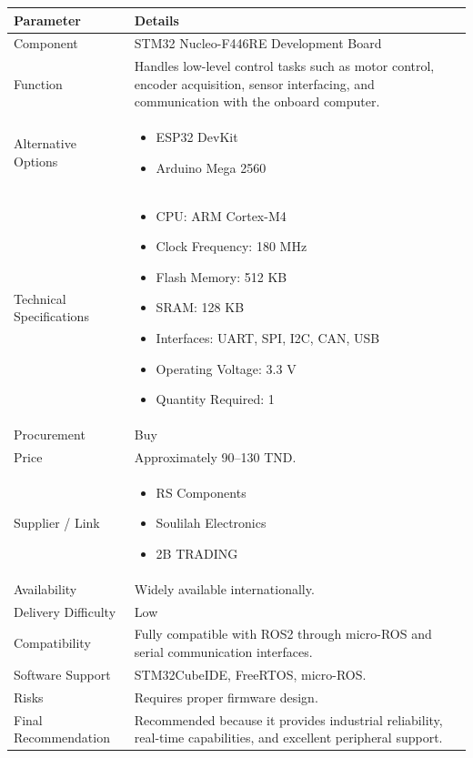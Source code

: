 \documentclass[12pt,a4paper]{article}
\begin{document}
\begin{longtable}{|p{4cm}|p{10cm}|}
\hline
\textbf{Parameter} & \textbf{Details} \\
\hline

Component &
STM32 Nucleo-F446RE Development Board \\
\hline

Function &
Handles low-level control tasks such as motor control, encoder acquisition, sensor interfacing, and communication with the onboard computer. \\
\hline


Alternative Options &
\begin{itemize}
\item ESP32 DevKit
\item Arduino Mega 2560
\end{itemize}
\\
\hline

Technical Specifications &
\begin{itemize}
\item CPU: ARM Cortex-M4
\item Clock Frequency: 180 MHz
\item Flash Memory: 512 KB
\item SRAM: 128 KB
\item Interfaces: UART, SPI, I2C, CAN, USB
\item Operating Voltage: 3.3 V
\item Quantity Required: 1
\end{itemize}
\\
\hline

Procurement &
Buy \\
\hline

Price &
Approximately 90--130 TND. \\
\hline

Supplier / Link &
\begin{itemize}
\item RS Components 
\item Soulilah Electronics
\item 2B TRADING
\end{itemize}
\\
\hline

Availability &
Widely available internationally. \\
\hline

Delivery Difficulty &
Low \\
\hline

Compatibility &
Fully compatible with ROS2 through micro-ROS and serial communication interfaces. \\
\hline

Software Support &
STM32CubeIDE, FreeRTOS, micro-ROS. \\
\hline

Risks &
Requires proper firmware design. \\
\hline

Final Recommendation &
Recommended because it provides industrial reliability, real-time capabilities, and excellent peripheral support. \\
\hline

\end{longtable}
\end{document}
